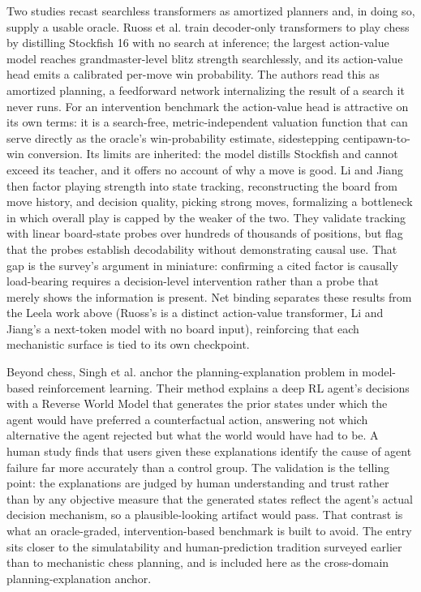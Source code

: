 \documentclass[conference]{IEEEtran}
\begin{document}
Two studies recast searchless transformers as amortized planners and, in doing so, supply a usable oracle. Ruoss et al. \cite{ref7} train decoder-only transformers to play chess by distilling Stockfish 16 with no search at inference; the largest action-value model reaches grandmaster-level blitz strength searchlessly, and its action-value head emits a calibrated per-move win probability. The authors read this as amortized planning, a feedforward network internalizing the result of a search it never runs. For an intervention benchmark the action-value head is attractive on its own terms: it is a search-free, metric-independent valuation function that can serve directly as the oracle's win-probability estimate, sidestepping centipawn-to-win conversion. Its limits are inherited: the model distills Stockfish and cannot exceed its teacher, and it offers no account of why a move is good. Li and Jiang \cite{ref52} then factor playing strength into state tracking, reconstructing the board from move history, and decision quality, picking strong moves, formalizing a bottleneck in which overall play is capped by the weaker of the two. They validate tracking with linear board-state probes over hundreds of thousands of positions, but flag that the probes establish decodability without demonstrating causal use. That gap is the survey's argument in miniature: confirming a cited factor is causally load-bearing requires a decision-level intervention rather than a probe that merely shows the information is present. Net binding separates these results from the Leela work above (Ruoss's is a distinct action-value transformer, Li and Jiang's a next-token model with no board input), reinforcing that each mechanistic surface is tied to its own checkpoint.

Beyond chess, Singh et al. \cite{ref46} anchor the planning-explanation problem in model-based reinforcement learning. Their method explains a deep RL agent's decisions with a Reverse World Model that generates the prior states under which the agent would have preferred a counterfactual action, answering not which alternative the agent rejected but what the world would have had to be. A human study finds that users given these explanations identify the cause of agent failure far more accurately than a control group. The validation is the telling point: the explanations are judged by human understanding and trust rather than by any objective measure that the generated states reflect the agent's actual decision mechanism, so a plausible-looking artifact would pass. That contrast is what an oracle-graded, intervention-based benchmark is built to avoid. The entry sits closer to the simulatability and human-prediction tradition surveyed earlier than to mechanistic chess planning, and is included here as the cross-domain planning-explanation anchor.
\end{document}
